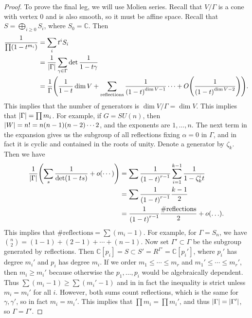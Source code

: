 \documentclass[leqno, openany]{memoir}
\theoremstyle{definition}
\theoremstyle{remark}
\theoremstyle{plain}
\theoremstyle{definition}
\theoremstyle{remark}
\newcommand{\C}{\mathbb{C}}
\begin{document}
\begin{proof}
    To prove the final leg, we will use Molien series. Recall that $V/{\Gamma}$
    is a cone with vertex $0$ and is also smooth, so it must be affine space.
    Recall that $S = \bigoplus_{i \geq 0} S_i$, where $S_0 = \C$. Then
    \begin{align*} \frac{1}{\prod(1-t^{m_i})} &= \sum_i t^i S_i \\ &=
        \frac{1}{\abs{\Gamma}} \sum_{\gamma \in \Gamma} \det \frac{1}{1- t
        \gamma} \\ &= \frac{1}{\Gamma} \qty(\frac{1}{1-t} \dim V +
        \sum_{\text{reflections}} \frac{1}{{(1-t)}^{\dim V - 1}} \cdots +
        O\qty(\frac{1}{{(1-t)}^{\dim V - 2}})).  \end{align*} This implies that
        the number of generators is $\dim V/\Gamma = \dim V$. This implies that
        $\abs{\Gamma} = \prod m_i$. For example, if $G = SU(n)$, then $\abs{W}
        = n! = n(n-1)(n-2) \cdots 2$, and the exponents are $1, \ldots, n$. The
        next term in the expansion gives us the subgroup of all reflections
        fixing $\alpha = 0$ in $\Gamma$, and in fact it is cyclic and contained
        in the roots of unity. Denote a generator by $\zeta_k$. Then we have
        \begin{align*} \frac{1}{\abs{\Gamma}} \qty( \sum_s \frac{1}{\det(1-ts)}
            + o(\cdots) ) &= \sum \frac{1}{{(1-t)}^{r-1}} \sum_{i=1}^{k-1}
            \frac{1}{1-\zeta_k^i t} \\ &= \sum \frac{1}{{(1-t)}^{r-1}}
        \frac{k-1}{2} \\ &= \frac{1}{{(1-t)}^{r-1}} \frac{\#
    \text{reflections}}{2} + o(\ldots).  \end{align*} This implies that $\#
    \text{reflections} = \sum (m_i - 1)$. For example, for $\Gamma = S_n$, we
    have $\binom{n}{2} = (1-1) + (2-1) + \cdots + (n-1)$. Now set $\Gamma'
    \subset \Gamma$ be the subgroup generated by reflections. Then $\C[p_i] = S
    \subset S' = R^{\Gamma'} = \C[p_i']$, where $p_i'$ has degree $m_i'$ and
    $p_i$ has degree $m_i$. If we order $m_1 \leq \cdots \leq m_r$ and $m_1'
    \leq \cdots \leq m_r'$, then $m_i \geq m_i'$ because otherwise the $p_1,
    \ldots, p_i$ would be algebraically dependent. Thus $\sum (m_i - 1) \geq
    \sum (m_i' - 1)$ and in in fact the inequality is strict unless $m_i =
    m_i'$ for all $i$. However, both sums count reflections, which is the same
    for $\gamma, \gamma'$, so in fact $m_i = m_i'$. This implies that $\prod
    m_i = \prod m_i'$, and thus $\abs{\Gamma} = \abs{\Gamma'}$, so $\Gamma =
    \Gamma'$.  \end{proof}
\end{document}
